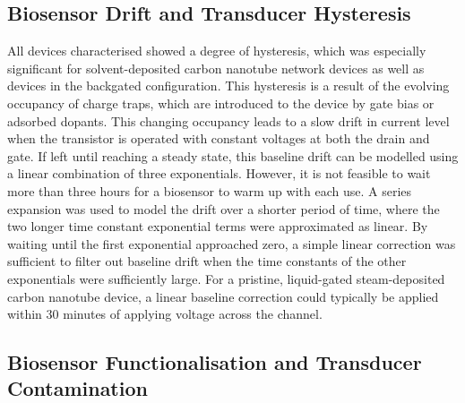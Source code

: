 \documentclass[
  a4paper,
]{scrbook}
\begin{document}
\hypertarget{biosensor-drift-and-transducer-hysteresis}{%
\subsection{Biosensor Drift and Transducer
Hysteresis}\label{biosensor-drift-and-transducer-hysteresis}}

All devices characterised showed a degree of hysteresis, which was
especially significant for solvent-deposited carbon nanotube network
devices as well as devices in the backgated configuration. This
hysteresis is a result of the evolving occupancy of charge traps, which
are introduced to the device by gate bias or adsorbed dopants. This
changing occupancy leads to a slow drift in current level when the
transistor is operated with constant voltages at both the drain and
gate. If left until reaching a steady state, this baseline drift can be
modelled using a linear combination of three exponentials. However, it
is not feasible to wait more than three hours for a biosensor to warm up
with each use. A series expansion was used to model the drift over a
shorter period of time, where the two longer time constant exponential
terms were approximated as linear. By waiting until the first
exponential approached zero, a simple linear correction was sufficient
to filter out baseline drift when the time constants of the other
exponentials were sufficiently large. For a pristine, liquid-gated
steam-deposited carbon nanotube device, a linear baseline correction
could typically be applied within 30 minutes of applying voltage across
the channel.

\hypertarget{biosensor-functionalisation-and-transducer-contamination}{%
\subsection{Biosensor Functionalisation and Transducer
Contamination}\label{biosensor-functionalisation-and-transducer-contamination}}
\end{document}
